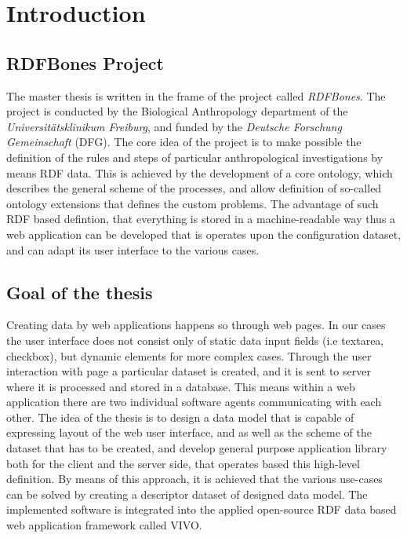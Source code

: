 \chapter{Introduction}


\section{RDFBones Project}

The master thesis is written in the frame of the project called \textit{RDFBones}. The project is conducted by the Biological Anthropology department of the \textit{Universitätsklinikum Freiburg}, and funded by the \textit{Deutsche Forschung Gemeinschaft} (DFG). The core idea of the project is to make possible the definition of the rules and steps of particular anthropological investigations by means RDF data. This is achieved by the development of a core ontology, which describes the general scheme of the processes, and allow definition of so-called ontology extensions that defines the custom problems. The advantage of such RDF based defintion, that everything is stored in a machine-readable way thus a web application can be developed that is operates upon the configuration dataset, and can adapt its user interface to the various cases. 


\section{Goal of the thesis}

Creating data by web applications happens so through web pages. In our cases the user interface does not consist only of static data input fields (i.e textarea, checkbox), but dynamic elements for more complex cases. Through the user interaction with page a particular dataset is created, and it is sent to server where it is processed and stored in a database. This means within a web application there are two individual software agents communicating with each other. The idea of the thesis is to design a data model that is capable of expressing layout of the web user interface, and as well as the scheme of the dataset that has to be created, and develop general purpose application library both for the client and the server side, that operates based this high-level definition. By means of this approach, it is achieved that the various use-cases can be solved by creating a descriptor dataset of designed data model. The implemented software is integrated into the applied open-source RDF data based web application framework called VIVO.

